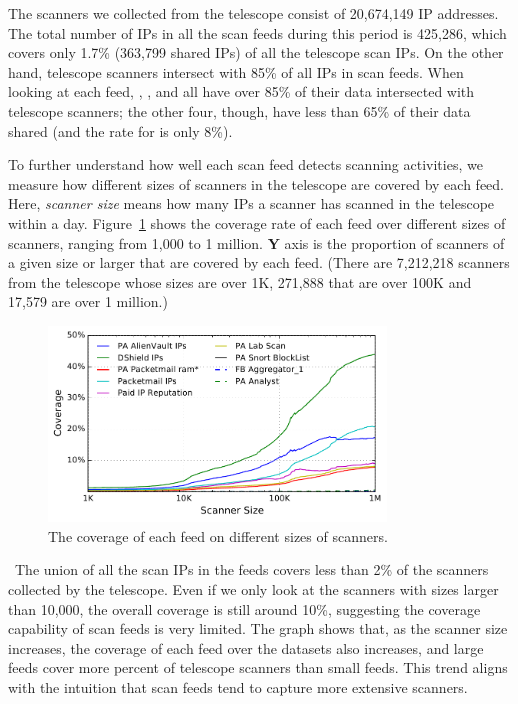 The scanners we collected from the telescope consist of 20,674,149 IP addresses.
The total number of IPs in all the scan feeds during this period is
425,286, which covers only 1.7\% (363,799 shared IPs) of all the telescope scan IPs.
On the other hand, telescope scanners intersect with 85\% of all IPs in scan feeds.
When looking at each feed, {\feedTSAlienVault}, {\feeddshield}
{\feedpacketmail}, {\feedTSLabScan} and {\feedTSramnode} all have over 85\% of their
data intersected with telescope scanners; the other four, though, have less than 65\%
of their data shared (and the rate for {\feedTSSnort} is only 8\%).


To further understand how well each scan feed detects scanning
activities, we measure how different sizes of scanners in the
telescope are covered by each feed. Here, \emph{scanner size} means how
many IPs a scanner has scanned in the telescope within a
day. Figure~\ref{fig:caida_coverage_cdf} shows the coverage rate of
each feed over different sizes of scanners, ranging from 1,000 to
1 million. \textbf{Y} axis is the proportion of scanners of a given size or 
larger that are covered by each feed. (There are 7,212,218 scanners from the 
telescope whose sizes
are over 1K, 271,888 that are over 100K and 17,579 are over 1 million.)


\begin{figure}
\centering
\includegraphics[width=0.8\textwidth]{data_character/images/caida_coverage_cdf.pdf}
\caption{The coverage of each feed on different sizes of scanners.}
\label{fig:caida_coverage_cdf}
\end{figure}

\finding\
The union of all the scan IPs in the feeds covers less than
2\% of the scanners collected by the telescope. Even if we only look
at the scanners with sizes larger than 10,000, the overall coverage is still
around 10\%, suggesting the coverage capability of scan feeds
is very limited. The graph shows that, as the scanner size increases, the coverage of
each feed over the datasets also increases, and large feeds cover more percent
of telescope scanners than small feeds. This trend aligns with the intuition that
scan feeds tend to capture more extensive scanners.

